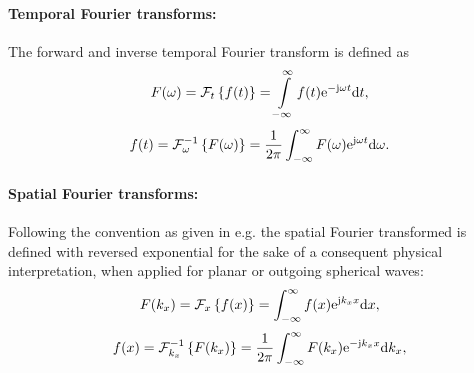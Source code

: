 \printnomenclature
%
\vspace{1cm}
\paragraph{Temporal Fourier transforms:}
The forward and inverse temporal Fourier transform is defined as 
\begin{equation}
\label{eq:temporal_fourier_transform_def}
F(\omega) = \mathcal{F}_t \left\{ f(t) \right\} = \int\limits_ {-\infty}^{\infty} f(t) \mathrm{e}^{-\mathrm{j} \omega t} \mathrm{d} t,
\end{equation}
\begin{equation}
\label{eq:temporal_inverse_fourier_transform_def}
f(t) = \mathcal{F}_{\omega}^{-1} \left\{ F(\omega) \right\} = \frac{1}{2\pi} \int_ {-\infty}^{\infty} F(\omega) \mathrm{e}^{ \mathrm{j} \omega t} \mathrm{d} \omega.
\end{equation}
%
\paragraph{Spatial Fourier transforms:}
Following the convention as given in e.g. \cite{Williams1999} the spatial Fourier transformed is defined with reversed exponential for the sake of a consequent physical interpretation, when applied for planar or outgoing spherical waves:
\begin{equation}
\label{eq:spatial_fourier_transform_def}
F(k_x) = \mathcal{F}_x \left\{ f(x) \right\} = \int_ {-\infty}^{\infty} f(x) \mathrm{e}^{\mathrm{j} k_x x} \mathrm{d} x,
\end{equation}
\begin{equation}
\label{eq:spatial_inverse_fourier_transform_def}
f(x) = \mathcal{F}_{k_x}^{-1} \left\{ F(k_x) \right\} = \frac{1}{2\pi} \int_ {-\infty}^{\infty} F(k_x) \mathrm{e}^{ -\mathrm{j} k_x x} \mathrm{d} k_x,
\end{equation}


%
